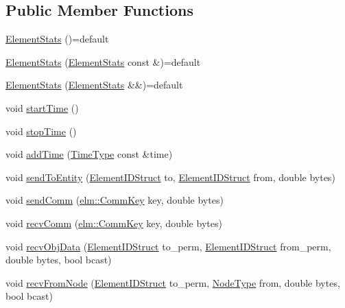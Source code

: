 \subsection*{Public Member Functions}
\begin{DoxyCompactItemize}
\item 
\hyperlink{structvt_1_1elm_1_1_element_stats_a9a07ef20788a8b9f4f0b8633352cb931}{Element\+Stats} ()=default
\item 
\hyperlink{structvt_1_1elm_1_1_element_stats_afa1b9b94a8d93abc67c8be727f1fab44}{Element\+Stats} (\hyperlink{structvt_1_1elm_1_1_element_stats}{Element\+Stats} const \&)=default
\item 
\hyperlink{structvt_1_1elm_1_1_element_stats_a0c8aacbfe7048bc11abc78887736415a}{Element\+Stats} (\hyperlink{structvt_1_1elm_1_1_element_stats}{Element\+Stats} \&\&)=default
\item 
void \hyperlink{structvt_1_1elm_1_1_element_stats_a58f57dbc6d180338d53a8acd8ba29712}{start\+Time} ()
\item 
void \hyperlink{structvt_1_1elm_1_1_element_stats_ac3ec6239fc848a98d7c9aba6e0331764}{stop\+Time} ()
\item 
void \hyperlink{structvt_1_1elm_1_1_element_stats_af2d4d8b10b3f97b6a13a9bf8df0561ca}{add\+Time} (\hyperlink{namespacevt_a876a9d0cd5a952859c72de8a46881442}{Time\+Type} const \&time)
\item 
void \hyperlink{structvt_1_1elm_1_1_element_stats_af9452e09210ecdfae2b1759ee1b1fb91}{send\+To\+Entity} (\hyperlink{structvt_1_1elm_1_1_element_i_d_struct}{Element\+I\+D\+Struct} to, \hyperlink{structvt_1_1elm_1_1_element_i_d_struct}{Element\+I\+D\+Struct} from, double bytes)
\item 
void \hyperlink{structvt_1_1elm_1_1_element_stats_a43ee151dce76d5480f2121e8b2deaac2}{send\+Comm} (\hyperlink{structvt_1_1elm_1_1_comm_key}{elm\+::\+Comm\+Key} key, double bytes)
\item 
void \hyperlink{structvt_1_1elm_1_1_element_stats_a5ec30d76df833e12cebf39fc25eb514a}{recv\+Comm} (\hyperlink{structvt_1_1elm_1_1_comm_key}{elm\+::\+Comm\+Key} key, double bytes)
\item 
void \hyperlink{structvt_1_1elm_1_1_element_stats_aaf35c3797e1bce9710051a7fc5a46dc1}{recv\+Obj\+Data} (\hyperlink{structvt_1_1elm_1_1_element_i_d_struct}{Element\+I\+D\+Struct} to\+\_\+perm, \hyperlink{structvt_1_1elm_1_1_element_i_d_struct}{Element\+I\+D\+Struct} from\+\_\+perm, double bytes, bool bcast)
\item 
void \hyperlink{structvt_1_1elm_1_1_element_stats_a33b8bdd69b89776a08055fbd72979fd2}{recv\+From\+Node} (\hyperlink{structvt_1_1elm_1_1_element_i_d_struct}{Element\+I\+D\+Struct} to\+\_\+perm, \hyperlink{namespacevt_a866da9d0efc19c0a1ce79e9e492f47e2}{Node\+Type} from, double bytes, bool bcast)

\end{DoxyCompactItemize}
